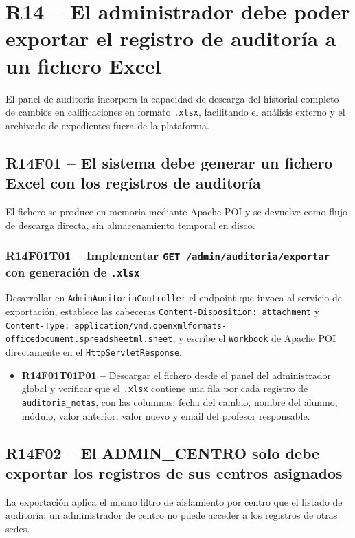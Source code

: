 \documentclass[12pt, a4paper]{report}
\begin{document}
\section{R14 -- El administrador debe poder exportar el registro de auditoría a un fichero Excel}

El panel de auditoría incorpora la capacidad de descarga del historial completo de cambios en calificaciones en formato \texttt{.xlsx}, facilitando el análisis externo y el archivado de expedientes fuera de la plataforma.

\subsection{R14F01 -- El sistema debe generar un fichero Excel con los registros de auditoría}

El fichero se produce en memoria mediante Apache POI y se devuelve como flujo de descarga directa, sin almacenamiento temporal en disco.

\subsubsection{R14F01T01 -- Implementar \texttt{GET /admin/auditoria/exportar} con generación de \texttt{.xlsx}}
Desarrollar en \texttt{AdminAuditoriaController} el endpoint que invoca al servicio de exportación, establece las cabeceras \texttt{Content-Disposition: attachment} y \texttt{Content-Type: application/vnd.openxmlformats-officedocument.spreadsheetml.sheet}, y escribe el \texttt{Workbook} de Apache POI directamente en el \texttt{HttpServletResponse}.
\begin{itemize}
  \item \textbf{R14F01T01P01 --} Descargar el fichero desde el panel del administrador global y verificar que el \texttt{.xlsx} contiene una fila por cada registro de \texttt{auditoria\_notas}, con las columnas: fecha del cambio, nombre del alumno, módulo, valor anterior, valor nuevo y email del profesor responsable.
\end{itemize}

\subsection{R14F02 -- El ADMIN\_CENTRO solo debe exportar los registros de sus centros asignados}

La exportación aplica el mismo filtro de aislamiento por centro que el listado de auditoría: un administrador de centro no puede acceder a los registros de otras sedes.
\end{document}
